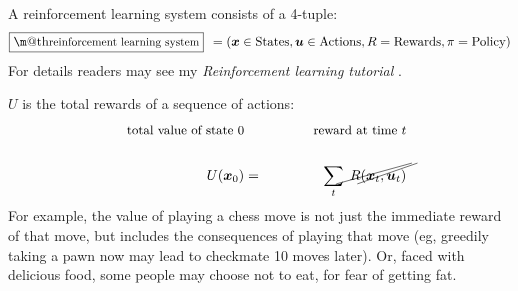 \documentclass[orivec]{llncs}
\makeatletter
\newcommand{\emp}[1]{\textbf{#1}}
\newcommand{\tikzmark}[1]{\tikz[overlay,remember picture] \node (#1) {};}
\newcommand{\vect}[1]{\boldsymbol{#1}}
\renewcommand{\boxed}[1]{\fbox{\m@th$\displaystyle\scalebox{0.9}{#1}$} \,}
\makeatother
\begin{document}
A reinforcement learning system consists of a 4-tuple:
\begin{equation}
\boxed{\mbox{reinforcement learning system}} \; = (\vect{x} \in \mbox{States}, \vect{u} \in \mbox{Actions}, R = \mbox{Rewards}, \pi = \mbox{Policy})
\end{equation}
For details readers may see my \textit{Reinforcement learning tutorial} \cite{YanRLtutorialEN}.


$U$ is the total rewards of a sequence of actions:
\begin{eqnarray}
\mbox{\footnotesize total value of state 0} \tikzmark{uu} & \quad \quad \quad & \mbox{\footnotesize reward at time $t$} \tikzmark{rr} \nonumber \\
\nonumber \\
\tikzmark{UU} U(\vect{x}_0) & = & \sum_t \; \tikzmark{RR} R(\vect{x}_t, \vect{u}_t)
\begin{tikzpicture}[overlay,remember picture]
  \draw (uu.center) +(-50pt,-3pt) -- ([shift={(4pt,12pt)}]UU.center);
  \draw (rr.center) +(-35pt,-3pt) -- ([shift={(8pt,12pt)}]RR.center);
\end{tikzpicture}
\end{eqnarray}
For example, the value of playing a chess move is not just the immediate reward of that move, but includes the consequences of playing that move (eg, greedily taking a pawn now may lead to checkmate 10 moves later).  Or, faced with delicious food, some people may choose not to eat, for fear of getting fat.

\end{document}
